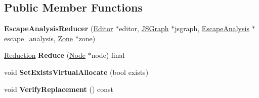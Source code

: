 \subsection*{Public Member Functions}
\begin{DoxyCompactItemize}
\item 
{\bfseries Escape\+Analysis\+Reducer} (\hyperlink{classv8_1_1internal_1_1compiler_1_1_advanced_reducer_1_1_editor}{Editor} $\ast$editor, \hyperlink{classv8_1_1internal_1_1compiler_1_1_j_s_graph}{J\+S\+Graph} $\ast$jsgraph, \hyperlink{classv8_1_1internal_1_1compiler_1_1_escape_analysis}{Escape\+Analysis} $\ast$escape\+\_\+analysis, \hyperlink{classv8_1_1internal_1_1_zone}{Zone} $\ast$zone)\hypertarget{classv8_1_1internal_1_1compiler_1_1_escape_analysis_reducer_aa0ff475018f1ec5b567916e8b8fa8e23}{}\label{classv8_1_1internal_1_1compiler_1_1_escape_analysis_reducer_aa0ff475018f1ec5b567916e8b8fa8e23}

\item 
\hyperlink{classv8_1_1internal_1_1compiler_1_1_reduction}{Reduction} {\bfseries Reduce} (\hyperlink{classv8_1_1internal_1_1compiler_1_1_node}{Node} $\ast$node) final\hypertarget{classv8_1_1internal_1_1compiler_1_1_escape_analysis_reducer_a19c35daad6d26eb66c03efd3456f6b5c}{}\label{classv8_1_1internal_1_1compiler_1_1_escape_analysis_reducer_a19c35daad6d26eb66c03efd3456f6b5c}

\item 
void {\bfseries Set\+Exists\+Virtual\+Allocate} (bool exists)\hypertarget{classv8_1_1internal_1_1compiler_1_1_escape_analysis_reducer_a6209d8792cd7499d780ab792c991feea}{}\label{classv8_1_1internal_1_1compiler_1_1_escape_analysis_reducer_a6209d8792cd7499d780ab792c991feea}

\item 
void {\bfseries Verify\+Replacement} () const \hypertarget{classv8_1_1internal_1_1compiler_1_1_escape_analysis_reducer_a5029fe898dc98f4ce71f24dcd9fe2a36}{}\label{classv8_1_1internal_1_1compiler_1_1_escape_analysis_reducer_a5029fe898dc98f4ce71f24dcd9fe2a36}

\end{DoxyCompactItemize}
